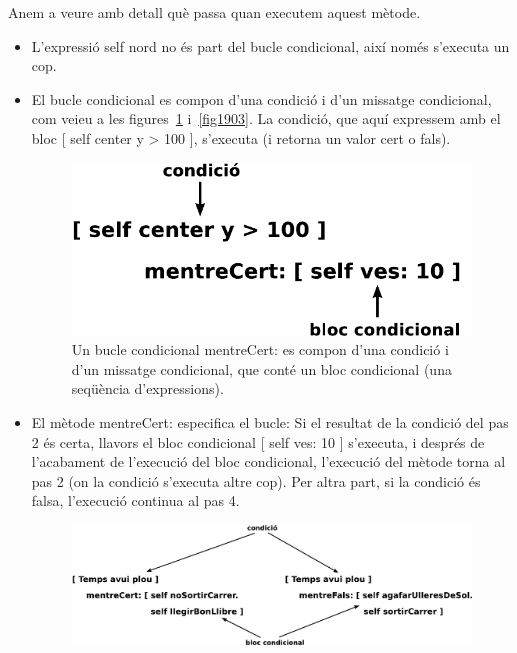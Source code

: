 Anem a veure amb detall què passa quan executem aquest mètode.   
\begin{itemize} 
\item[\textbf{1.}] L'expressió \textsf{self nord} no és part del bucle condicional, així només s'executa un cop.
\item[\textbf{2.}] El bucle condicional es compon d'una condició i d'un missatge condicional, com veieu a les figures~\ref{fig1902} i~\ref{fig1903}. La condició, que aquí expressem amb el bloc \textsf{[  self center y \textgreater \hspace*{1mm} 100  ]}, s'executa (i retorna un valor cert o fals).
\begin{figure}[h!]
\begin{center}
\includegraphics[scale=0.6]{Imatges/figura19-2.pdf}
\end{center}
\caption{Un bucle condicional \textsf{\upshape mentreCert:} es compon d'una condició i d'un missatge condicional, que conté un bloc condicional (una seqüència d'expressions).}
\label{fig1902}
\end{figure}
\item[\textbf{3.}] El mètode \textsf{mentreCert:} especifica el bucle: Si el resultat de la condició del pas 2 és certa, llavors el bloc condicional \textsf{[ self ves: 10 ]} s'executa, i després de l'acabament de l'execució del bloc condicional, l'execució del mètode torna al pas 2 (on la condició s'executa altre cop). Per altra part, si la condició és falsa, l'execució continua al pas 4.
\begin{figure}[h!]
\begin{center}
\includegraphics[scale=0.5]{Imatges/figura19-3.pdf}

\end{center}
\end{figure}
\end{itemize}
